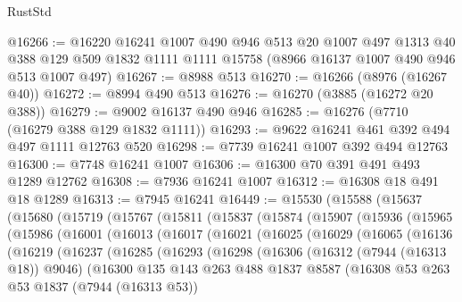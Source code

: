 \begin{lexlean}{RustStd}
\begin{coremodule}
@16266 := @16220
    @16241
    @1007
    @490
    @946
    @513
    @20
    @1007
    @497
    @1313
    @40
    @388
    @129
    @509
    @1832
    @1111
    @1111
    @15758
    (@8966 @16137 @1007 @490 @946 @513 @1007 @497)
@16267 := @8988 @513
@16270 := @16266 (@8976 (@16267 @40))
@16272 := @8994 @490 @513
@16276 := @16270 (@3885 (@16272 @20 @388))
@16279 := @9002 @16137 @490 @946
@16285 := @16276 (@7710 (@16279 @388 @129 @1832 @1111))
@16293 := @9622 @16241 @461 @392 @494 @497 @1111 @12763 @520
@16298 := @7739 @16241 @1007 @392 @494 @12763
@16300 := @7748 @16241 @1007
@16306 := @16300 @70 @391 @491 @493 @1289 @12762
@16308 := @7936 @16241 @1007
@16312 := @16308 @18 @491 @18 @1289
@16313 := @7945 @16241
@16449 := @15530
    (@15588
      (@15637
        (@15680
          (@15719
            (@15767
              (@15811
                (@15837
                  (@15874
                    (@15907
                      (@15936
                        (@15965
                          (@15986
                            (@16001
                              (@16013
                                (@16017
                                  (@16021
                                    (@16025
                                      (@16029
                                        (@16065
                                          (@16136
                                            (@16219
                                              (@16237
                                                (@16285
                                                  (@16293
                                                    (@16298
                                                      (@16306
                                                        (@16312 (@7944 (@16313 @18)) @9046)
                                                        (@16300
                                                          @135
                                                          @143
                                                          @263
                                                          @488
                                                          @1837
                                                          @8587
                                                          (@16308
                                                            @53
                                                            @263
                                                            @53
                                                            @1837
                                                            (@7944 (@16313 @53))

\end{coremodule}
\end{lexlean}
